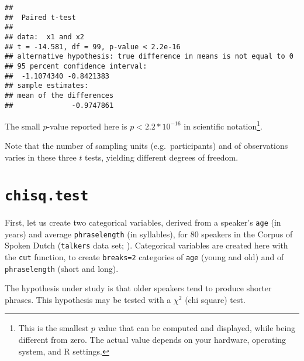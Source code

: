 \documentclass[]{book}
\newenvironment{Shaded}{\begin{snugshade}}{\end{snugshade}}
\newcommand{\DataTypeTok}[1]{\textcolor[rgb]{0.13,0.29,0.53}{#1}}
\newcommand{\DecValTok}[1]{\textcolor[rgb]{0.00,0.00,0.81}{#1}}
\newcommand{\KeywordTok}[1]{\textcolor[rgb]{0.13,0.29,0.53}{\textbf{#1}}}
\newcommand{\NormalTok}[1]{#1}
\newcommand{\OperatorTok}[1]{\textcolor[rgb]{0.81,0.36,0.00}{\textbf{#1}}}
\newcommand{\StringTok}[1]{\textcolor[rgb]{0.31,0.60,0.02}{#1}}
\begin{document}
\begin{verbatim}
## 
##  Paired t-test
## 
## data:  x1 and x2
## t = -14.581, df = 99, p-value < 2.2e-16
## alternative hypothesis: true difference in means is not equal to 0
## 95 percent confidence interval:
##  -1.1074340 -0.8421383
## sample estimates:
## mean of the differences 
##              -0.9747861
\end{verbatim}

The small \(p\)-value reported here is \(p < 2.2 * 10^{-16}\) in scientific notation\footnote{This is the smallest \(p\) value that can be computed and displayed, while being different from zero. The actual value depends on your hardware, operating system, and R settings.}.

Note that the number of sampling units (e.g.~participants) and of observations varies in these three \(t\) tests, yielding different degrees of freedom.

\hypertarget{chisq.test}{%
\section{\texorpdfstring{\texttt{chisq.test}}{chisq.test}}\label{chisq.test}}

First, let us create two categorical variables, derived from a
speaker's \texttt{age} (in years) and average \texttt{phraselength} (in
syllables), for 80 speakers in the Corpus of Spoken Dutch (\texttt{talkers} data set; \citep{R-hqmisc}).
Categorical variables are created here with the
\texttt{cut} function, to create
\texttt{breaks=2} categories of \texttt{age} (young and
old) and of \texttt{phraselength} (short and long).

\begin{Shaded}
\end{Shaded}

The hypothesis under study is that older speakers tend to produce
shorter phrases. This hypothesis may be tested with a \(\chi^2\) (chi
square) test.\\
\end{document}

